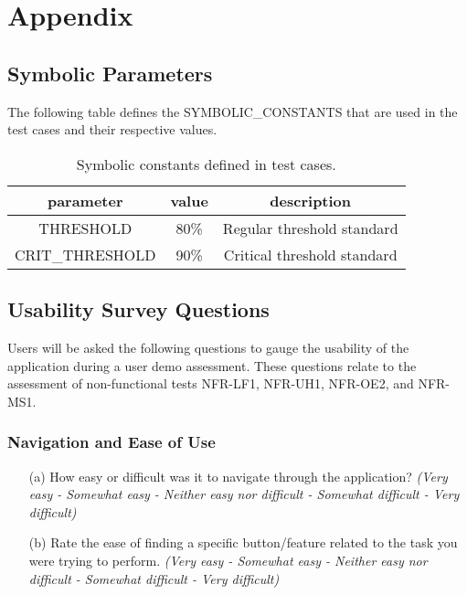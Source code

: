 \documentclass[12pt, titlepage]{article}
\begin{document}
				
%

%

\newpage

\section{Appendix}

\subsection{Symbolic Parameters}

The following table defines the SYMBOLIC\_CONSTANTS that are used in the test
cases and their respective values.

\bigskip

\begin{table}[htb]
\caption{Symbolic constants defined in test cases.}
\centering
\begin{tabular}{c c c}
  \toprule
  \textbf{parameter} & \textbf{value} & \textbf{description}\\
  \midrule 
  THRESHOLD & 80\% & Regular threshold standard\\
  CRIT\_THRESHOLD & 90\% & Critical threshold standard\\
  \bottomrule
\end{tabular}
\end{table}

\subsection{Usability Survey Questions} \label{usabilitySurvey}

Users will be asked the following questions to gauge the usability of the
application during a user demo assessment. These questions relate to the
assessment of non-functional tests NFR-LF1, NFR-UH1, NFR-OE2, and NFR-MS1.

\subsubsection*{\textbf{Navigation and Ease of Use}}
  \begin{itemize}
    \item[(a)] How easy or difficult was it to navigate through the application?
    \textit{(Very easy - Somewhat easy - Neither easy nor difficult - Somewhat
    difficult - Very difficult)}
    \item[(b)] Rate the ease of finding a specific button/feature related to the
    task you were trying to perform. \textit{(Very easy - Somewhat easy -
    Neither easy nor difficult - Somewhat difficult - Very difficult)}
  \end{itemize}
\end{document}
